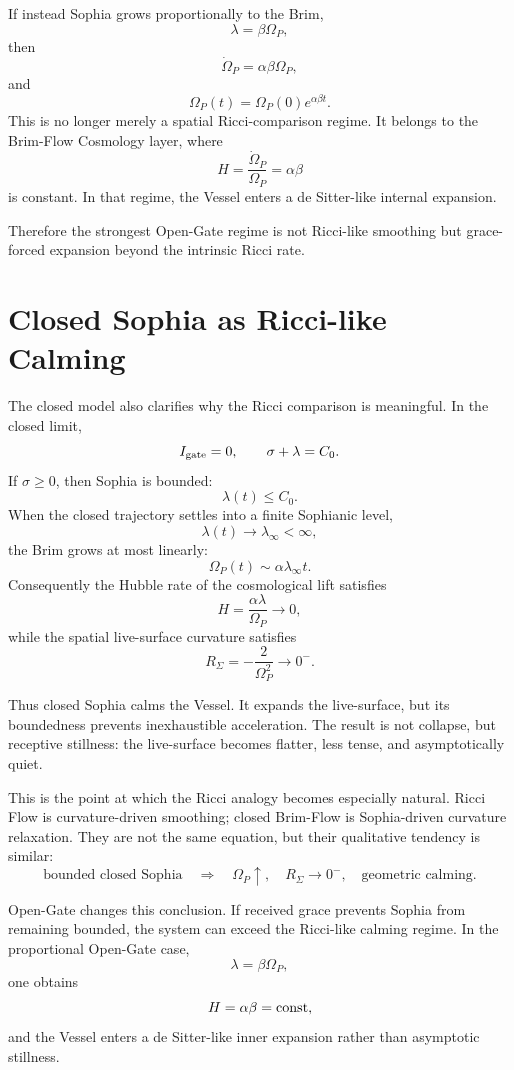 \documentclass[11pt]{article}
\begin{document}
If instead Sophia grows proportionally to the Brim,
\[
 \lambda=\beta\Omega_P,
\]
then
\[
 \dot\Omega_P=\alpha\beta\Omega_P,
\]
and
\[
 \Omega_P(t)=\Omega_P(0)e^{\alpha\beta t}.
\]
This is no longer merely a spatial Ricci-comparison regime. It belongs to the Brim-Flow Cosmology layer, where
\[
 H=\frac{\dot\Omega_P}{\Omega_P}=\alpha\beta
\]
is constant. In that regime, the Vessel enters a de Sitter-like internal expansion.

Therefore the strongest Open-Gate regime is not Ricci-like smoothing but grace-forced expansion beyond the intrinsic Ricci rate.


\section{Closed Sophia as Ricci-like Calming}

The closed model also clarifies why the Ricci comparison is meaningful. In the closed limit,
\[
 I_{\rm gate}=0,
 \qquad
 \sigma+\lambda=C_0.
\]
If \(\sigma\ge0\), then Sophia is bounded:
\[
 \lambda(t)\le C_0.
\]
When the closed trajectory settles into a finite Sophianic level,
\[
 \lambda(t)\to\lambda_{\infty}<\infty,
\]
the Brim grows at most linearly:
\[
 \Omega_P(t)\sim \alpha\lambda_{\infty}t.
\]
Consequently the Hubble rate of the cosmological lift satisfies
\[
 H=\frac{\alpha\lambda}{\Omega_P}\to0,
\]
while the spatial live-surface curvature satisfies
\[
 R_{\Sigma}=-\frac{2}{\Omega_P^2}\to0^-.
\]

Thus closed Sophia calms the Vessel. It expands the live-surface, but its boundedness prevents inexhaustible acceleration. The result is not collapse, but receptive stillness: the live-surface becomes flatter, less tense, and asymptotically quiet.

This is the point at which the Ricci analogy becomes especially natural. Ricci Flow is curvature-driven smoothing; closed Brim-Flow is Sophia-driven curvature relaxation. They are not the same equation, but their qualitative tendency is similar:
\[
 \text{bounded closed Sophia}
 \quad\Longrightarrow\quad
 \Omega_P\uparrow,
 \quad
 R_{\Sigma}\to0^-,
 \quad
 \text{geometric calming}.
\]

Open-Gate changes this conclusion. If received grace prevents Sophia from remaining bounded, the system can exceed the Ricci-like calming regime. In the proportional Open-Gate case,
\[
 \lambda=\beta\Omega_P,
\]
one obtains
\[
 H=\alpha\beta={\rm const},
\]
and the Vessel enters a de Sitter-like inner expansion rather than asymptotic stillness.
\end{document}
